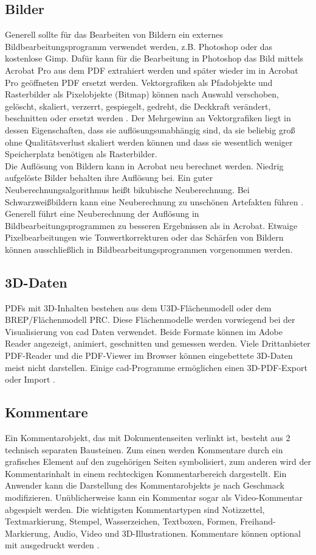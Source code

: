 \subsection{Bilder}
Generell sollte für das Bearbeiten von Bildern ein externes Bildbearbeitungsprogramm verwendet werden, z.B. Photoshop oder das kostenlose Gimp. Dafür kann für die Bearbeitung in Photoshop das Bild mittels Acrobat Pro aus dem PDF extrahiert werden und später wieder im in Acrobat Pro geöffneten PDF ersetzt werden. Vektorgrafiken als Pfadobjekte und Rasterbilder als Pixelobjekte (Bitmap) können nach Auswahl verschoben, gelöscht, skaliert, verzerrt, gespiegelt, gedreht, die Deckkraft verändert, beschnitten oder ersetzt werden \cite{schneeberger}. Der Mehrgewinn an Vektorgrafiken liegt in dessen Eigenschaften, dass sie auflösungsunabhängig sind, da sie beliebig groß ohne Qualitätsverlust skaliert werden können und dass sie wesentlich weniger Speicherplatz benötigen als Rasterbilder. \\
Die Auflösung von Bildern kann in Acrobat neu berechnet werden. Niedrig aufgelöste Bilder behalten ihre Auflösung bei. Ein guter Neuberechnungsalgorithmus heißt bikubische Neuberechnung. Bei Schwarzweißbildern kann eine Neuberechnung zu unschönen Artefakten führen \cite{buehler}. Generell führt eine Neuberechnung der Auflösung in Bildbearbeitungsprogrammen zu besseren Ergebnissen als in Acrobat. Etwaige Pixelbearbeitungen wie Tonwertkorrekturen oder das Schärfen von Bildern können ausschließlich in Bildbearbeitungsprogrammen vorgenommen werden. 

\subsection{3D-Daten}
PDFs mit 3D-Inhalten bestehen aus dem U3D-Flächenmodell oder dem BREP/Flächenmodell PRC. Diese Flächenmodelle werden vorwiegend bei der Visualisierung von \gls{cad} Daten verwendet. Beide Formate können im Adobe Reader angezeigt, animiert, geschnitten und gemessen werden. Viele Drittanbieter PDF-Reader und die PDF-Viewer im Browser können eingebettete 3D-Daten meist nicht darstellen. Einige \gls{cad}-Programme ermöglichen einen 3D-PDF-Export oder Import \cite{wiki-pdf-de}. 

\subsection{Kommentare}
Ein Kommentarobjekt, das mit Dokumentenseiten verlinkt ist, besteht aus 2 technisch separaten Bausteinen. Zum einen werden Kommentare durch ein grafisches Element auf den zugehörigen Seiten symbolisiert, zum anderen wird der Kommentarinhalt in einem rechteckigen Kommentarbereich dargestellt. Ein Anwender kann die Darstellung des Kommentarobjekts je nach Geschmack modifizieren. Unüblicherweise kann ein Kommentar sogar als Video-Kommentar abgespielt werden. Die wichtigsten Kommentartypen sind Notizzettel, Textmarkierung, Stempel, Wasserzeichen, Textboxen, Formen, Freihand-Markierung, Audio, Video und 3D-Illustrationen. Kommentare können optional mit ausgedruckt werden \cite{softx}. 

